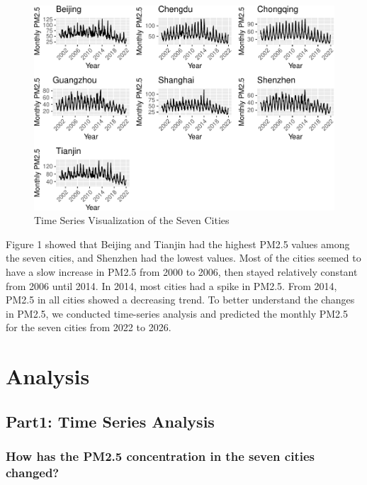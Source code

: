 \documentclass[
  12pt,
]{article}
\begin{document}
\begin{figure}
\centering
\includegraphics{LiFangRenZhang_ENV872_Project_files/figure-latex/TSA Visualization-1.pdf}
\caption{Time Series Visualization of the Seven Cities}
\end{figure}

Figure 1 showed that Beijing and Tianjin had the highest PM2.5 values
among the seven cities, and Shenzhen had the lowest values. Most of the
cities seemed to have a slow increase in PM2.5 from 2000 to 2006, then
stayed relatively constant from 2006 until 2014. In 2014, most cities
had a spike in PM2.5. From 2014, PM2.5 in all cities showed a decreasing
trend. To better understand the changes in PM2.5, we conducted
time-series analysis and predicted the monthly PM2.5 for the seven
cities from 2022 to 2026.

\newpage

\hypertarget{analysis}{%
\section{Analysis}\label{analysis}}

\hypertarget{part1-time-series-analysis}{%
\subsection{Part1: Time Series
Analysis}\label{part1-time-series-analysis}}

\hypertarget{how-has-the-pm2.5-concentration-in-the-seven-cities-changed}{%
\subsubsection{How has the PM2.5 concentration in the seven cities
changed?}\label{how-has-the-pm2.5-concentration-in-the-seven-cities-changed}}
\end{document}

